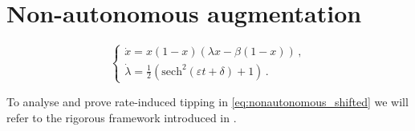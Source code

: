 \documentclass[../main.tex]{subfiles}
\begin{document}
\section{Non-autonomous augmentation}\label{sec:nonautonomous_augmentation}

\begin{equation}\label{eq:nonautonomous_shifted}
   \begin{cases}
           \dot{x} = x(1-x)(\lambda x - \beta(1-x))\,, \\
           \dot{\lambda} =  \frac{1}{2}(\text{sech}^{2}(\varepsilon t + \delta) + 1)\,. 
   \end{cases}
\end{equation}

To analyse and prove rate-induced tipping in \eqref{eq:nonautonomous_shifted} we will refer to the rigorous framework introduced in \cite{Ashwin17}.

% 
%
\end{document}
